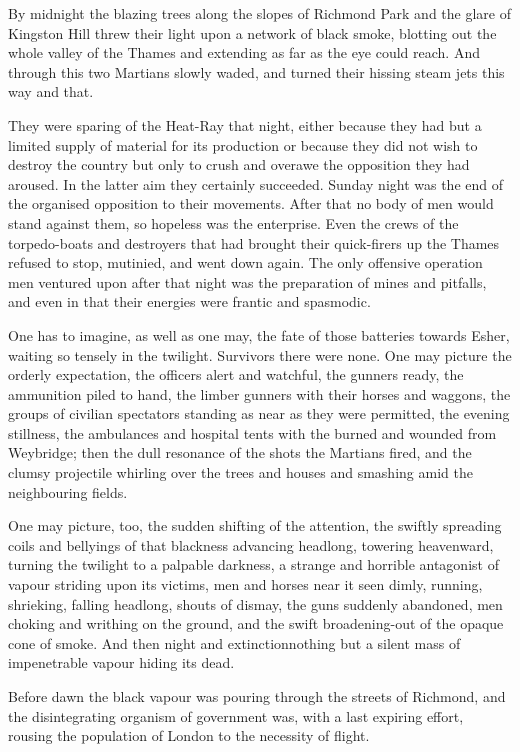 By midnight the blazing trees along the slopes of Richmond Park and
the glare of Kingston Hill threw their light upon a network of
black smoke, blotting out the whole valley of the Thames and
extending as far as the eye could reach. And through this two
Martians slowly waded, and turned their hissing steam jets this way
and that.

They were sparing of the Heat-Ray that night, either because they
had but a limited supply of material for its production or because
they did not wish to destroy the country but only to crush and
overawe the opposition they had aroused. In the latter aim they
certainly succeeded. Sunday night was the end of the organised
opposition to their movements. After that no body of men would
stand against them, so hopeless was the enterprise. Even the crews
of the torpedo-boats and destroyers that had brought their
quick-firers up the Thames refused to stop, mutinied, and went down
again. The only offensive operation men ventured upon after that
night was the preparation of mines and pitfalls, and even in that
their energies were frantic and spasmodic.

One has to imagine, as well as one may, the fate of those batteries
towards Esher, waiting so tensely in the twilight. Survivors there
were none. One may picture the orderly expectation, the officers
alert and watchful, the gunners ready, the ammunition piled to
hand, the limber gunners with their horses and waggons, the groups
of civilian spectators standing as near as they were permitted, the
evening stillness, the ambulances and hospital tents with the
burned and wounded from Weybridge; then the dull resonance of the
shots the Martians fired, and the clumsy projectile whirling over
the trees and houses and smashing amid the neighbouring fields.

One may picture, too, the sudden shifting of the attention, the
swiftly spreading coils and bellyings of that blackness advancing
headlong, towering heavenward, turning the twilight to a palpable
darkness, a strange and horrible antagonist of vapour striding upon
its victims, men and horses near it seen dimly, running, shrieking,
falling headlong, shouts of dismay, the guns suddenly abandoned,
men choking and writhing on the ground, and the swift
broadening-out of the opaque cone of smoke. And then night and
extinction\dash{}nothing but a silent mass of impenetrable vapour hiding
its dead.

Before dawn the black vapour was pouring through the streets of
Richmond, and the disintegrating organism of government was, with a
last expiring effort, rousing the population of London to the
necessity of flight.

